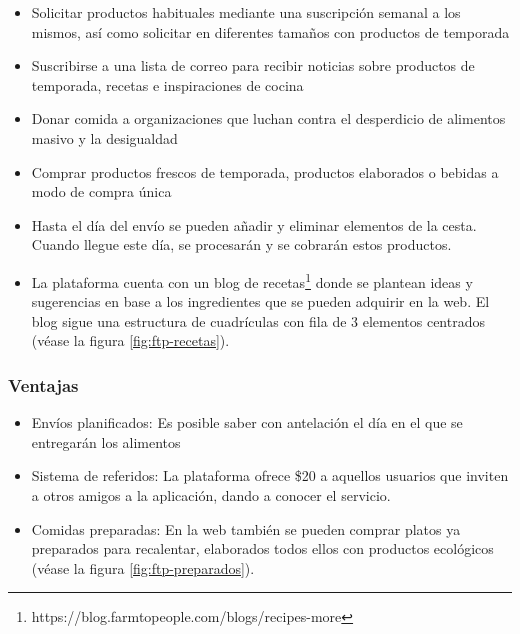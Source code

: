 \begin{itemize}

	\item Solicitar productos habituales mediante una suscripción semanal a los mismos, así como solicitar  en diferentes tamaños con productos de temporada

	\item Suscribirse a una lista de correo para recibir noticias sobre productos de temporada, recetas e inspiraciones de cocina

	\item Donar comida a organizaciones que luchan contra el desperdicio de alimentos masivo y la desigualdad

	\item Comprar productos frescos de temporada, productos elaborados o bebidas a modo de compra única

	\item Hasta el día del envío se pueden añadir y eliminar elementos de la cesta. Cuando llegue este día, se procesarán y se cobrarán estos productos.

	\item La plataforma cuenta con un blog de recetas\footnote{https://blog.farmtopeople.com/blogs/recipes-more} donde se plantean ideas y sugerencias en base a los ingredientes que se pueden adquirir en la web. El blog sigue una estructura de cuadrículas con fila de 3 elementos centrados (véase la figura \ref{fig:ftp-recetas}).

\end{itemize}


\subsubsection{Ventajas}

\begin{itemize}

	\item Envíos planificados: Es posible saber con antelación el día en el que se entregarán los alimentos

	\item Sistema de referidos: La plataforma ofrece \$20 a aquellos usuarios que inviten a otros amigos a la aplicación, dando a conocer el servicio.

	\item Comidas preparadas: En la web también se pueden comprar platos ya preparados para recalentar, elaborados todos ellos con productos ecológicos (véase la figura \ref{fig:ftp-preparados}).

\end{itemize}

